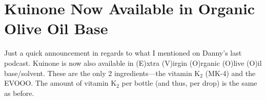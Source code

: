 \chapter{Kuinone Now Available in Organic Olive Oil Base}

\begin{refsection}

Just a quick announcement in regards to what I mentioned on Danny's last podcast. Kuinone is now also available in (E)xtra (V)irgin (O)rganic (O)live (O)il base/solvent. These are the only 2 ingredients---the vitamin K$_{2}$ (MK-4) and the EVOOO. The amount of vitamin K$_{2}$ per bottle (and thus, per drop) is the same as before.

\printbibliography[heading=subbibliography]

\end{refsection}